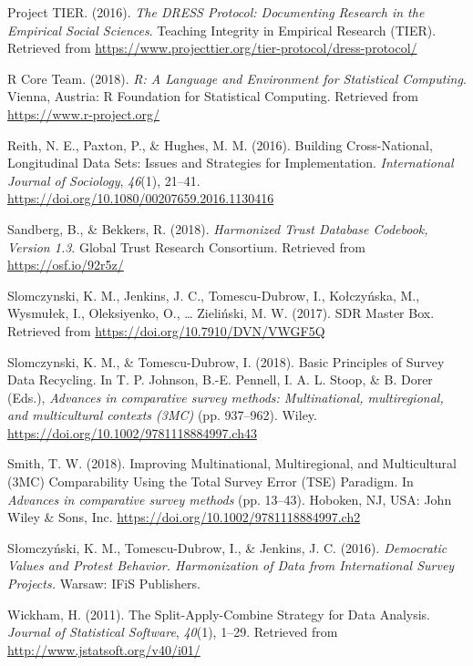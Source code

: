 \documentclass[12pt,]{article}
\begin{document}
\leavevmode\hypertarget{ref-ProjectTIER2016}{}%
Project TIER. (2016). \emph{The DRESS Protocol: Documenting Research in the Empirical Social Sciences}. Teaching Integrity in Empirical Research (TIER). Retrieved from \url{https://www.projecttier.org/tier-protocol/dress-protocol/}

\leavevmode\hypertarget{ref-baser}{}%
R Core Team. (2018). \emph{R: A Language and Environment for Statistical Computing}. Vienna, Austria: R Foundation for Statistical Computing. Retrieved from \url{https://www.r-project.org/}

\leavevmode\hypertarget{ref-Reith2016}{}%
Reith, N. E., Paxton, P., \& Hughes, M. M. (2016). Building Cross-National, Longitudinal Data Sets: Issues and Strategies for Implementation. \emph{International Journal of Sociology}, \emph{46}(1), 21--41. \url{https://doi.org/10.1080/00207659.2016.1130416}

\leavevmode\hypertarget{ref-Sandberg2018}{}%
Sandberg, B., \& Bekkers, R. (2018). \emph{Harmonized Trust Database Codebook, Version 1.3}. Global Trust Research Consortium. Retrieved from \url{https://osf.io/92r5z/}

\leavevmode\hypertarget{ref-Slomczynskietal2017}{}%
Slomczynski, K. M., Jenkins, J. C., Tomescu-Dubrow, I., Kołczyńska, M., Wysmułek, I., Oleksiyenko, O., \ldots{} Zieliński, M. W. (2017). SDR Master Box. Retrieved from \url{https://doi.org/10.7910/DVN/VWGF5Q}

\leavevmode\hypertarget{ref-Slomczynski2018}{}%
Slomczynski, K. M., \& Tomescu-Dubrow, I. (2018). Basic Principles of Survey Data Recycling. In T. P. Johnson, B.-E. Pennell, I. A. L. Stoop, \& B. Dorer (Eds.), \emph{Advances in comparative survey methods: Multinational, multiregional, and multicultural contexts (3MC)} (pp. 937--962). Wiley. \url{https://doi.org/10.1002/9781118884997.ch43}

\leavevmode\hypertarget{ref-Smith2018}{}%
Smith, T. W. (2018). Improving Multinational, Multiregional, and Multicultural (3MC) Comparability Using the Total Survey Error (TSE) Paradigm. In \emph{Advances in comparative survey methods} (pp. 13--43). Hoboken, NJ, USA: John Wiley \& Sons, Inc. \url{https://doi.org/10.1002/9781118884997.ch2}

\leavevmode\hypertarget{ref-Slomczynskietal2016}{}%
Słomczyński, K. M., Tomescu-Dubrow, I., \& Jenkins, J. C. (2016). \emph{Democratic Values and Protest Behavior. Harmonization of Data from International Survey Projects.} Warsaw: IFiS Publishers.

\leavevmode\hypertarget{ref-Wickham2011}{}%
Wickham, H. (2011). The Split-Apply-Combine Strategy for Data Analysis. \emph{Journal of Statistical Software}, \emph{40}(1), 1--29. Retrieved from \url{http://www.jstatsoft.org/v40/i01/}
\end{document}
